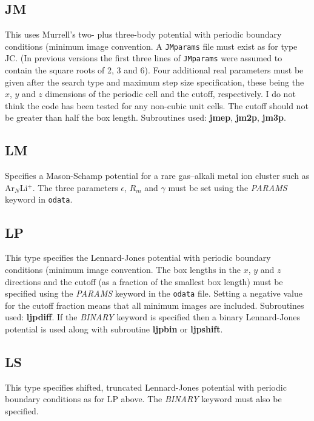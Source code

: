 \documentclass[12pt,a4paper,dvips]{article}
\begin{document}
\subsection{JM}This uses Murrell's two- plus three-body 
potential\cite{murrellm90,murrellr90,alderzijmr91,eggenjlm92,fengjm93} with periodic boundary
conditions (minimum image convention.\cite{allent87} 
A {\tt JMparams} file must exist as for type JC. (In previous versions the 
first three lines of {\tt JMparams} were assumed to contain
the square roots of 2, 3 and 6). Four additional real parameters must be given after the
search type and maximum step size specification, these being the $x$, $y$ and $z$ dimensions
of the periodic cell and the cutoff, respectively. I do not think the code has been tested
for any non-cubic unit cells. The cutoff should not be greater than half the box length.\cite{allent87}
Subroutines used: {\bf jmep}, {\bf jm2p}, {\bf jm3p}.

\subsection{LM}Specifies a Mason-Schamp potential\cite{Mason58} for a rare gas--alkali metal ion cluster
such as Ar$_{N}$Li$^+$. The three parameters $\epsilon$, $R_m$ and $\gamma$
must be set using the {\it PARAMS\/} keyword in {\tt odata}.

\subsection{LP}This type specifies the Lennard-Jones potential with 
periodic boundary conditions (minimum image convention.\cite{allent87}
The box lengths in the $x$, $y$ and $z$ 
directions and the cutoff (as a fraction of the smallest box length)
must be specified using the {\it PARAMS\/} keyword in the {\tt odata} file.
Setting a negative value for the cutoff fraction means that all minimum
images are included.
Subroutines used: {\bf ljpdiff}.
If the {\it BINARY\/} keyword is specified then a binary Lennard-Jones
potential is used\cite{sastryds98} along with subroutine {\bf ljpbin} or {\bf ljpshift}.

\subsection{LS}This type specifies shifted, truncated Lennard-Jones potential with 
periodic boundary conditions as for LP above. The {\it BINARY\/} keyword must also be 
specified.
\end{document}
